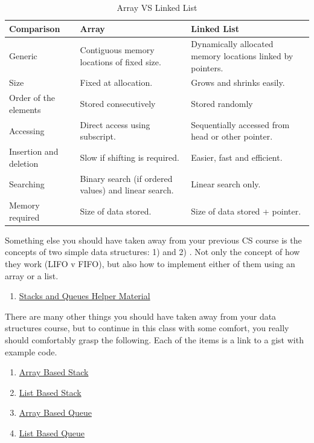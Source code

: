 \begin{table}[ht]
\footnotesize
    \centering
    \begin{tabular}{|p{3cm}|p{5.5cm}|p{6cm}|}
        \hline
        \textbf{Comparison} & \textbf{Array} & \textbf{Linked List} \\
        \hline
        Generic & Contiguous memory locations of fixed size.& Dynamically allocated memory locations linked by pointers. \\
        \hline
        Size & Fixed at allocation. & Grows and shrinks easily. \\
        \hline
        Order of the elements &	Stored consecutively & Stored randomly\\
        \hline
        Accessing  & Direct access using subscript. & Sequentially accessed from head or other pointer. \\
        \hline
        Insertion and deletion & Slow if shifting is required. & Easier, fast and efficient.\\
        \hline
        Searching &	Binary search (if ordered values) and linear search. & Linear search only.\\
        \hline
        Memory required & Size of data stored.	& Size of data stored + pointer.\\
        \hline
    \end{tabular}
    \caption{Array VS Linked List}
    \label{table:listvarray}
\end{table}


Something else you should have taken away from your previous CS course is the concepts of two simple data structures: 1)  and 2) . Not only the concept of how they work (LIFO v FIFO), but also how to implement either of them using an array or a list.

 \begin{enumerate}
    \item \href{https://cs.msutexas.edu/~griffin/materials/StacksAndQueues.pdf}{Stacks and Queues Helper Material}
\end{enumerate}

There are many other things you should have taken away from your data structures course, but to continue in this class with some comfort, you really should comfortably grasp the following. Each of the items is a link to a gist with example code. 

 \begin{enumerate}
    \item \href{https://gist.github.com/rugbyprof/1ebeeb6a5942050b8e326762f114cddd}{Array Based Stack}
    \item \href{https://gist.github.com/rugbyprof/84fd677220eeae40bdc7be07600f6f58}{List Based Stack}
    \item \href{https://gist.github.com/rugbyprof/3960ce651ae5397f525b1d83a69fa899}{Array Based Queue}
    \item \href{https://gist.github.com/rugbyprof/cb9bb1627d234e0987369028da524197}{List Based Queue}
\end{enumerate}

